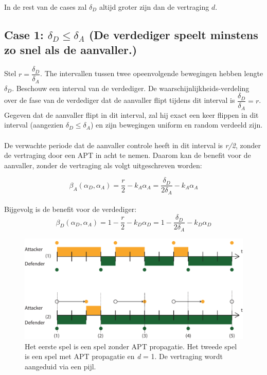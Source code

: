 \documentclass[master=cws, masteroption=vs,english]{kulemt}
\begin{document}
\begin{abstract*}
In de rest van de cases zal $\delta_{D}$ altijd groter zijn dan de vertraging $d$.

\subsection*{\textbf{Case 1:} $\delta_{D} \leq \delta_{A} $ (De verdediger speelt minstens zo snel als de aanvaller.) }

Stel $r = \dfrac{\delta_{D}}{ \delta_{A} }$. The intervallen tussen twee opeenvolgende bewegingen hebben lengte $\delta_{D}$. Beschouw een interval van de verdediger. De waarschijnlijkheids-verdeling over de fase van de verdediger dat de aanvaller flipt tijdens dit interval is $\dfrac{\delta_{D}}{ \delta_{A} } = r$. Gegeven dat de aanvaller flipt in dit interval, zal hij exact een keer flippen in dit interval (aangezien $\delta_{D} \leq \delta_{A} $) en zijn bewegingen uniform en random verdeeld zijn. \\ \\

De verwachte periode dat de aanvaller controle heeft in dit interval is \textit{r/2}, zonder de vertraging door een APT in acht te nemen. Daarom kan de benefit voor de aanvaller, zonder de vertraging als volgt uitgeschreven worden:

\begin{equation}\label{first}
\beta_{A}(\alpha_{D},\alpha_{A}) =\dfrac {r} {2} - k_{A} \alpha_{A} = \dfrac {\delta_{D}} {2\delta_{A}} - k_{A} \alpha_{A}  
\end{equation}\\

Bijgevolg is de benefit voor de verdediger:
\begin{equation}\label{first}
\beta_{D}(\alpha_{D},\alpha_{A}) =1 -  \dfrac {r} {2} - k_{D} \alpha_{D} = 1 - \dfrac {\delta_{D}} {2\delta_{A}} - k_{D} \alpha_{D} 
\end{equation}

\begin{figure}[hbtp]
\centering
\includegraphics[scale=0.6]{../../doc/template/Images/Delayuitgelegd}
\caption{Het eerste spel is een spel zonder APT propagatie. Het tweede spel is een spel met APT propagatie en \textit{d} = 1. De vertraging wordt aangeduid via een pijl.}
\label{fig:delaycase1}
\end{figure}



\end{abstract*}
\end{document}
